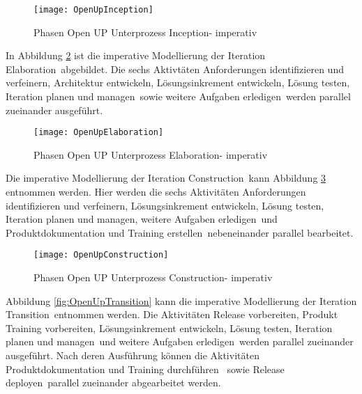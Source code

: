 \begin{figure}[htp]
\begin{center}
  \texttt{[image: OpenUpInception]} %
  \caption{Phasen Open UP Unterprozess Inception- imperativ}
  \label{fig:OpenUpInception}
\end{center}
\end{figure}

In Abbildung \ref{fig:OpenUpElaboration} ist die imperative Modellierung der Iteration \grqq Elaboration\grqq \ abgebildet. Die sechs Aktivtäten \grqq Anforderungen identifizieren und verfeinern\grqq , \grqq Architektur entwickeln\grqq, \grqq Lösungsinkrement entwickeln\grqq, \grqq Lösung testen\grqq, \grqq Iteration planen und managen\grqq \ sowie \grqq weitere Aufgaben erledigen\grqq \ werden parallel zueinander ausgeführt.

\begin{figure}[htp]
\begin{center}
  \texttt{[image: OpenUpElaboration]} %
  \caption{Phasen Open UP Unterprozess Elaboration- imperativ}
  \label{fig:OpenUpElaboration}
\end{center}
\end{figure}

Die imperative Modellierung der Iteration \grqq Construction\grqq \ kann Abbildung \ref{fig:OpenUpConstruction} entnommen werden. Hier werden die sechs Aktivitäten \grqq Anforderungen identifizieren und verfeinern\grqq, \grqq Lösungsinkrement entwickeln\grqq , \grqq Lösung testen\grqq , \grqq Iteration planen und managen\grqq , \grqq weitere Aufgaben erledigen\grqq  \ und \grqq Produktdokumentation und Training erstellen\grqq \ nebeneinander parallel bearbeitet.
\begin{figure}[htp]
\begin{center}
  \texttt{[image: OpenUpConstruction]} %
  \caption{Phasen Open UP Unterprozess Construction- imperativ}
  \label{fig:OpenUpConstruction}
\end{center}
\end{figure}

Abbildung \ref{fig:OpenUpTransition} kann die imperative Modellierung der Iteration \grqq Transition\grqq \ entnommen werden. Die Aktivitäten \grqq Release vorbereiten\grqq, \grqq  Produkt Training vorbereiten\grqq, \grqq Lösungsinkrement entwickeln\grqq, \grqq Lösung testen\grqq , \grqq Iteration planen und managen\grqq \ und \grqq weitere Aufgaben erledigen\grqq \ werden parallel zueinander ausgeführt. Nach deren Ausführung können die Aktivitäten Produktdokumentation und Training durchführen \grqq \ sowie \grqq Release deployen\grqq \  parallel zueinander abgearbeitet werden.

